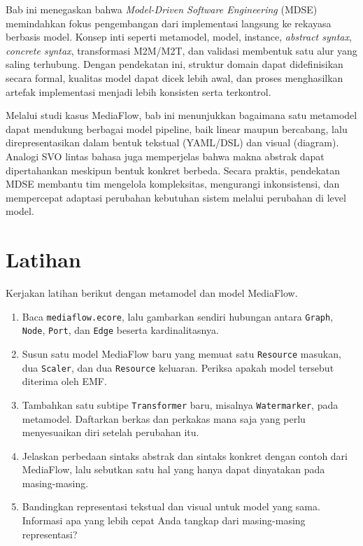 Bab ini menegaskan bahwa \textit{Model-Driven Software Engineering} (MDSE) memindahkan fokus pengembangan dari implementasi langsung ke rekayasa berbasis model. Konsep inti seperti metamodel, model, instance, \textit{abstract syntax}, \textit{concrete syntax}, transformasi M2M/M2T, dan validasi membentuk satu alur yang saling terhubung. Dengan pendekatan ini, struktur domain dapat didefinisikan secara formal, kualitas model dapat dicek lebih awal, dan proses menghasilkan artefak implementasi menjadi lebih konsisten serta terkontrol.

Melalui studi kasus MediaFlow, bab ini menunjukkan bagaimana satu metamodel dapat mendukung berbagai model pipeline, baik linear maupun bercabang, lalu direpresentasikan dalam bentuk tekstual (YAML/DSL) dan visual (diagram). Analogi SVO lintas bahasa juga memperjelas bahwa makna abstrak dapat dipertahankan meskipun bentuk konkret berbeda. Secara praktis, pendekatan MDSE membantu tim mengelola kompleksitas, mengurangi inkonsistensi, dan mempercepat adaptasi perubahan kebutuhan sistem melalui perubahan di level model.

\section{Latihan}

Kerjakan latihan berikut dengan metamodel dan model MediaFlow.

\begin{enumerate}
  \item Baca \texttt{mediaflow.ecore}, lalu gambarkan sendiri hubungan antara \texttt{Graph}, \texttt{Node}, \texttt{Port}, dan \texttt{Edge} beserta kardinalitasnya.
  \item Susun satu model MediaFlow baru yang memuat satu \texttt{Resource} masukan, dua \texttt{Scaler}, dan dua \texttt{Resource} keluaran. Periksa apakah model tersebut diterima oleh EMF.
  \item Tambahkan satu subtipe \texttt{Transformer} baru, misalnya \texttt{Watermarker}, pada metamodel. Daftarkan berkas dan perkakas mana saja yang perlu menyesuaikan diri setelah perubahan itu.
  \item Jelaskan perbedaan sintaks abstrak dan sintaks konkret dengan contoh dari MediaFlow, lalu sebutkan satu hal yang hanya dapat dinyatakan pada masing-masing.
  \item Bandingkan representasi tekstual dan visual untuk model yang sama. Informasi apa yang lebih cepat Anda tangkap dari masing-masing representasi?
\end{enumerate}

